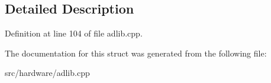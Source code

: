 \subsection{Detailed Description}


Definition at line 104 of file adlib.\-cpp.



The documentation for this struct was generated from the following file\-:\begin{DoxyCompactItemize}
\item 
src/hardware/adlib.\-cpp\end{DoxyCompactItemize}
